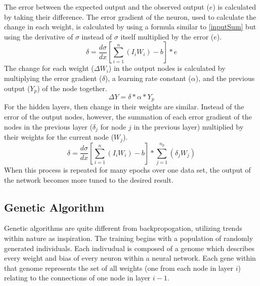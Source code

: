 \documentclass[12pt]{article}
\begin{document}
        The error between the expected output and the observed output (\(e\)) is calculated by taking their difference.
        The error gradient of the neuron, used to calculate the change in each weight, is calculated by using a formula similar
        to \ref{inputSum} but using the derivative of \(\sigma\) instead of \(\sigma\) itself multiplied by the error (\(e\)).
        \begin{equation}\label{errGradient}
            \delta = \frac{d\sigma}{dx}[\sum_{i=1}^{n} (I_i W_i) - b]*e
        \end{equation}
        The change for each weight (\(\Delta W_i\)) in the output nodes is calculated by multiplying the error gradient (\(\delta\)),
        a learning rate constant (\(\alpha\)), and the previous output (\(Y_p\)) of the node together.
        \begin{equation}\label{outputWeightDelta}
            \Delta Y = \delta*\alpha*Y_p
        \end{equation}
        For the hidden layers, then change in their weights are similar.  Instead of the error of the output nodes, however,
        the summation of each error gradient of the nodes in the previous layer (\(\delta_j\) for node \(j\) in the previous layer) 
        multiplied by their weights for the current node (\(W_j\)).
        \begin{equation}\label{hiddenWeightDelta}
            \delta = \frac{d\sigma}{dx}[\sum_{i=1}^{n} (I_i W_i) - b]*\sum_{j=1}^{n_p} (\delta_j W_j)
        \end{equation}
        When this process is repeated for many epochs over one data set, the output of the network becomes more
        tuned to the desired result.
    \subsection{Genetic Algorithm}
        Genetic algorithms are quite different from backpropogation, utilizing trends within nature as inspiration.
        The training begins with a population of randomly generated individuals.  Each indivudual is composed of a genome which 
        describes every weight and bias of every neuron within a neural network.  Each gene within that genome represents
        the set of all weights (one from each node in layer \(i\)) relating to the connections of one node in layer \(i-1\).
\end{document}
